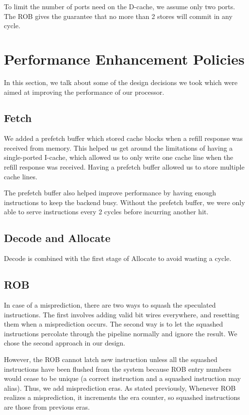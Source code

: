 \documentclass{article}
\begin{document}
To limit the number of ports need on the D-cache, we assume only two ports. The
ROB gives the guarantee that no more than 2 stores will commit in any cycle.

\section{Performance Enhancement Policies}
\label{sec:perf-policies}

In this section, we talk about some of the design decisions we took which were
aimed at improving the performance of our processor.

\subsection{Fetch}

We added a prefetch buffer which stored cache blocks when a refill response was
received from memory. This helped us get around the limitations of having a
single-ported I-cache, which allowed us to only write one cache line when the
refill response was received. Having a prefetch buffer allowed us to store
multiple cache lines.

The prefetch buffer also helped improve performance by having enough
instructions to keep the backend busy. Without the prefetch buffer, we were only
able to serve instructions every 2 cycles before incurring another hit.

\subsection{Decode and Allocate}

Decode is combined with the first stage of Allocate to avoid wasting a cycle.

\subsection{ROB}

In case of a misprediction, there are two ways to squash the speculated
instructions. The first involves adding valid bit wires everywhere, and
resetting them when a misprediction occurs. The second way is to let the
squashed instructions percolate through the pipeline normally and ignore the
result. We chose the second approach in our design.

However, the ROB cannot latch new instruction unless all the squashed
instructions have been flushed from the system because ROB entry numbers would
cease to be unique (a correct instruction and a squashed instruction may alias).
Thus, we add misprediction eras. As stated previously, Whenever ROB realizes a
misprediction, it increments the era counter, so squashed instructions are those
from previous eras.
\end{document}
